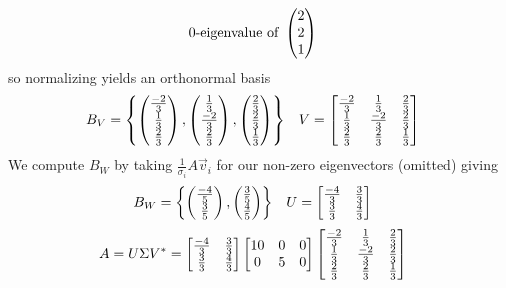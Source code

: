 \begin{defexample}
\begin{align}
      0\text{-eigenvalue of } & \begin{pmatrix} 2 \\ 2 \\ 1 \end{pmatrix}
    \end{align}
  so normalizing yields an orthonormal basis
    \begin{align}
      B_V &= \left\{
        \begin{pmatrix} \frac{-2}3 \\ \frac{1}3 \\ \frac{2}3 \end{pmatrix},
        \begin{pmatrix} \frac{1}3 \\ \frac{-2}3 \\ \frac{2}3 \end{pmatrix},
        \begin{pmatrix} \frac{2}3 \\ \frac{2}3 \\ \frac{1}3 \end{pmatrix}
      \right\} & V &= \begin{bmatrix}
        \frac{-2}3 & \frac{1}3 & \frac{2}3 \\
        \frac{1}3 & \frac{-2}3 & \frac{2}3 \\
        \frac{2}3 & \frac{2}3 & \frac{1}3 \\
      \end{bmatrix}
    \end{align}
  We compute $B_W$ by taking $\frac{1}{\sigma_i}A\vec v_i$ for our non-zero eigenvectors (omitted) giving
    \begin{align}
      B_W &= \left\{
        \begin{pmatrix} \frac{-4}5 \\ \frac{3}5 \end{pmatrix},
        \begin{pmatrix} \frac{3}5 \\ \frac{4}5 \end{pmatrix}
      \right\} & U &= \begin{bmatrix}
        \frac{-4}3 & \frac{3}3 \\
        \frac{3}3 & \frac{4}3
      \end{bmatrix}
    \end{align}
    \begin{align}
      A = U\Sigma V^* &= \begin{bmatrix}
        \frac{-4}3 & \frac{3}3 \\
        \frac{3}3 & \frac{4}3
      \end{bmatrix}\begin{bmatrix}
        10 & 0 & 0 \\
        0 & 5 & 0
      \end{bmatrix}\begin{bmatrix}
        \frac{-2}3 & \frac{1}3 & \frac{2}3 \\
        \frac{1}3 & \frac{-2}3 & \frac{2}3 \\
        \frac{2}3 & \frac{2}3 & \frac{1}3 \\
      \end{bmatrix}
    \end{align}
\end{defexample}

